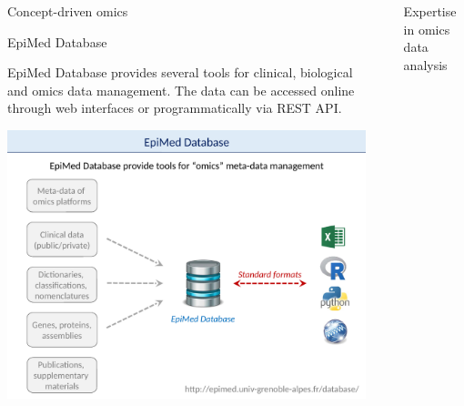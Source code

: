 \documentclass[final]{beamer}
\newlength{\sepwid}
\newlength{\twocolwid}
\begin{document}
\begin{frame}[t]
\begin{columns}[t]
\begin{column}{\twocolwid}
\begin{block}{Concept-driven omics}
\end{block}


\begin{block}{EpiMed Database}

EpiMed Database provides several tools for clinical, biological and omics data management. The data can be accessed online through web interfaces or programmatically via REST API.

{
\centering
\mbox{\includegraphics[trim = 0mm 0mm 0mm 30mm, clip, width=\linewidth]{figs/fig03}}

}


\end{block}

\end{column} 

\begin{column}{\sepwid}\end{column} %

\begin{column}{\twocolwid} %




\begin{block}{Expertise in omics data analysis}


\end{block}
\end{column}
\end{columns}
\end{frame}
\end{document}
